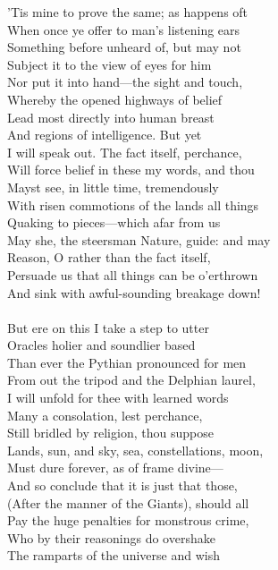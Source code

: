 'Tis mine to prove the same; as happens oft\\
When once ye offer to man's listening ears\\
Something before unheard of, but may not\\
Subject it to the view of eyes for him\\
Nor put it into hand—the sight and touch,\\
Whereby the opened highways of belief\\
Lead most directly into human breast\\
And regions of intelligence. But yet\\
I will speak out. The fact itself, perchance,\\
Will force belief in these my words, and thou\\
Mayst see, in little time, tremendously\\
With risen commotions of the lands all things\\
Quaking to pieces—which afar from us\\
May she, the steersman Nature, guide: and may\\
Reason, O rather than the fact itself,\\
Persuade us that all things can be o'erthrown\\
And sink with awful-sounding breakage down!\\
\\
But ere on this I take a step to utter\\
Oracles holier and soundlier based\\
Than ever the Pythian pronounced for men\\
From out the tripod and the Delphian laurel,\\
I will unfold for thee with learned words\\
Many a consolation, lest perchance,\\
Still bridled by religion, thou suppose\\
Lands, sun, and sky, sea, constellations, moon,\\
Must dure forever, as of frame divine—\\
And so conclude that it is just that those,\\
(After the manner of the Giants), should all\\
Pay the huge penalties for monstrous crime,\\
Who by their reasonings do overshake\\
The ramparts of the universe and wish\\
